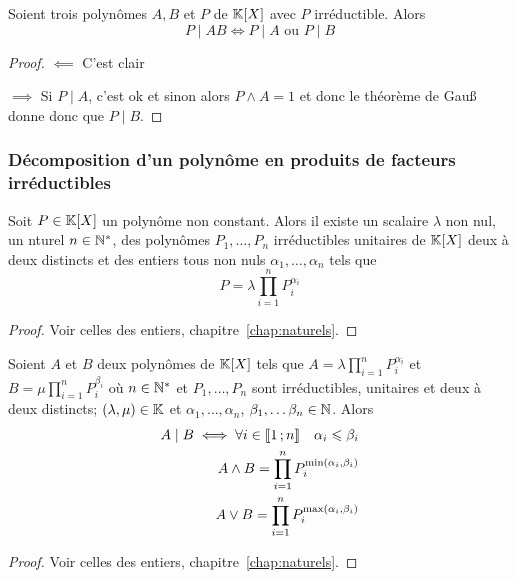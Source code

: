 \begin{prop}
  Soient trois polynômes \(A,B\) et \(P\) de \(\mathbb{K}[X]\) avec \(P\) irréductible.
  Alors
  \begin{equation}
    P\mid{}AB \iff P\mid{}A \text{~ou~} P\mid{}B
  \end{equation}
\end{prop}
\begin{proof}
  \(\impliedby\) C'est clair

  \(\implies\) Si \(P\mid{}A\), c'est ok et sinon alors \(P \wedge A = 1\) et donc
  le théorème de Gau\ss{} donne donc que \(P\mid{}B\).
\end{proof}

\subsubsection{Décomposition d'un polynôme en produits de facteurs
irréductibles}

\begin{theo}
  Soit \(P \in \mathbb{K}[X]\) un polynôme non constant. Alors il existe un scalaire
  \(\lambda\) non nul, un nturel \(n \in \mathbb{N}^*\), des polynômes \(P_1, \ldots,
  P_n\) irréductibles unitaires de \(\mathbb{K}[X]\) deux à deux distincts et des
  entiers tous non nuls \(\alpha_1, \ldots, \alpha_n\) tels que
  \begin{equation}
    P = \lambda \prod_{i = 1}^n P_i^{\alpha_i}
  \end{equation}
\end{theo}
\begin{proof}
  Voir celles des entiers, chapitre~\ref{chap:naturels}.
\end{proof}

\begin{cor}
  Soient \(A\) et \(B\) deux polynômes de \(\mathbb{K}[X]\) tels que \(A = \lambda
  \prod_{i = 1}^n P_i^{\alpha_i}\) et \(B = \mu \prod_{i = 1}^n P_i^{\beta_i}\) où \(n
  \in \mathbb{N}^*\) et \(P_1, \ldots, P_n\) sont irréductibles, unitaires et deux à
  deux distincts; \((\lambda, \mu)\in\mathbb{K}\) et \(\alpha_1, \ldots, \alpha_n\),
  \(\beta_1,\ldots \beta_n \in \mathbb{N}\). Alors
  \begin{align}
    A\mid{}B \iff \forall i \in \mathopen{\llbracket}1\mathclose{}\mathpunct{};n\mathclose{\rrbracket} \quad \alpha_i \leqslant
    \beta_i \\
    A \wedge B = \prod_{i = 1}^n P_i^{\min(\alpha_i,\beta_i)}\\
    A \vee B = \prod_{i = 1}^n P_i^{\max(\alpha_i,\beta_i)}
  \end{align}
\end{cor}
\begin{proof}
  Voir celles des entiers, chapitre~\ref{chap:naturels}.
\end{proof}
